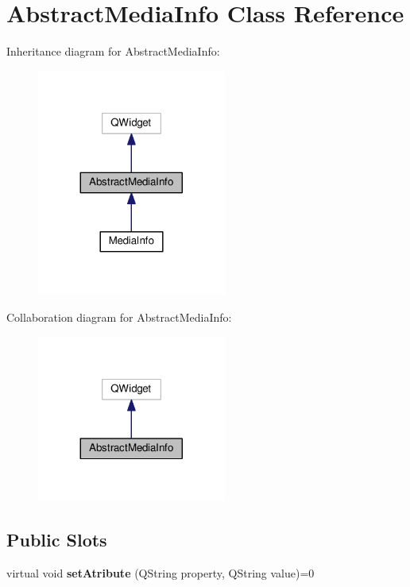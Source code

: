 \hypertarget{class_abstract_media_info}{\section{Abstract\-Media\-Info Class Reference}
\label{class_abstract_media_info}
}


Inheritance diagram for Abstract\-Media\-Info\-:
\nopagebreak
\begin{figure}[H]
\begin{center}
\leavevmode
\includegraphics[width=176pt]{class_abstract_media_info__inherit__graph}
\end{center}
\end{figure}


Collaboration diagram for Abstract\-Media\-Info\-:
\nopagebreak
\begin{figure}[H]
\begin{center}
\leavevmode
\includegraphics[width=176pt]{class_abstract_media_info__coll__graph}
\end{center}
\end{figure}
\subsection*{Public Slots}
\begin{DoxyCompactItemize}
\item 
\hypertarget{class_abstract_media_info_a59e096003b04baa551608fba8bed00d1}{virtual void {\bfseries set\-Atribute} (Q\-String property, Q\-String value)=0}\label{class_abstract_media_info_a59e096003b04baa551608fba8bed00d1}

\end{DoxyCompactItemize}
